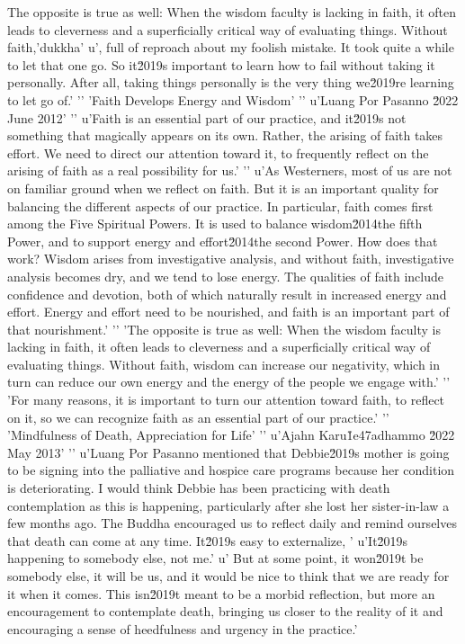 The opposite is true as well: When the wisdom faculty is lacking in 
faith, it often leads to cleverness and a superficially critical way of 
evaluating things. Without faith,'dukkha'
u', full of reproach about my foolish mistake. It took quite a while to let that one go. So it\u2019s important to learn how to fail without taking it personally. After all, taking things personally is the very thing we\u2019re learning to let go of.'
'\n'
'Faith Develops Energy and Wisdom'
'\n'
u'Luang Por Pasanno \u2022 June 2012'
'\n'
u'Faith is an essential part of our practice, and it\u2019s not something that magically appears on its own. Rather, the arising of faith takes effort. We need to direct our attention toward it, to frequently reflect on the arising of faith as a real possibility for us.'
'\n'
u'As Westerners, most of us are not on familiar ground when we reflect on faith. But it is an important quality for balancing the different aspects of our practice. In particular, faith comes first among the Five Spiritual Powers. It is used to balance wisdom\u2014the fifth Power, and to support energy and effort\u2014the second Power. How does that work? Wisdom arises from investigative analysis, and without faith, investigative analysis becomes dry, and we tend to lose energy. The qualities of faith include confidence and devotion, both of which naturally result in increased energy and effort. Energy and effort need to be nourished, and faith is an important part of that nourishment.'
'\n'
'The opposite is true as well: When the wisdom faculty is lacking in faith, it often leads to cleverness and a superficially critical way of evaluating things. Without faith, wisdom can increase our negativity, which in turn can reduce our own energy and the energy of the people we engage with.'
'\n'
'For many reasons, it is important to turn our attention toward faith, to reflect on it, so we can recognize faith as an essential part of our practice.'
'\n'
'Mindfulness of Death, Appreciation for Life'
'\n'
u'Ajahn Karu\u1e47adhammo \u2022 May 2013'
'\n'
u'Luang Por Pasanno mentioned that Debbie\u2019s mother is going to be signing into the palliative and hospice care programs because her condition is deteriorating. I would think Debbie has been practicing with death contemplation as this is happening, particularly after she lost her sister-in-law a few months ago. The Buddha encouraged us to reflect daily and remind ourselves that death can come at any time. It\u2019s easy to externalize, '
u'It\u2019s happening to somebody else, not me.'
u' But at some point, it won\u2019t be somebody else, it will be us, and it would be nice to think that we are ready for it when it comes. This isn\u2019t meant to be a morbid reflection, but more an encouragement to contemplate death, bringing us closer to the reality of it and encouraging a sense of heedfulness and urgency in the practice.'
